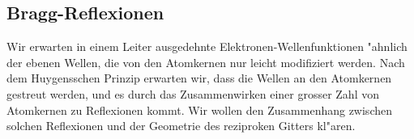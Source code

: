 



\subsection{Bragg-Reflexionen}
Wir erwarten in einem Leiter ausgedehnte Elektronen-Wellenfunktionen
"ahnlich der ebenen Wellen, die von den Atomkernen nur leicht modifiziert
werden.
Nach dem Huygensschen Prinzip erwarten wir, dass die Wellen an den
Atomkernen gestreut werden, und es durch das Zusammenwirken einer grosser
Zahl von Atomkernen zu Reflexionen kommt.
Wir wollen den Zusammenhang zwischen solchen Reflexionen und der Geometrie
des reziproken Gitters kl"aren.

